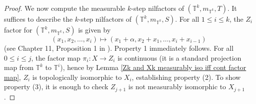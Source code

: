 \documentclass[12pt]{amsart}
\theoremstyle{definition}
\theoremstyle{plain}
\theoremstyle{definition}
\numberwithin{equation}{section}
\begin{document}
\begin{proof}
    



We now compute the measurable $k$-step nilfactors of $(\mathbb{T}^{k},m_{\mathbb{T}^{k}},T)$. It suffices to describe the $k$-step nilfactors of $(\mathbb{T}^{k},m_{\mathbb{T}^{k}},S)$.
For all $1\leq i \leq k$, the $Z_i$ factor for $(\mathbb{T}^{k},m_{\mathbb{T}^{k}},S)$ is given by $$(x_1,x_2,\dots,x_{i})\longmapsto (x_1+\alpha,x_2+x_1,\dots,x_{i}+x_{i-1})$$ (see Chapter 11, Proposition 1 in \cite{HK2}). Property 1 immediately follows. For all $0\leq i\leq j$, the factor map $\pi_{i}\colon X \rightarrow Z_{i}$ is continuous (it is a standard projection map from $\mathbb{T}^{k}$ to $\mathbb{T}^{i}$), hence by Lemma \ref{Zk and Xk measurably iso iff cont factor map}, $Z_i$ is topologically isomorphic to $X_i$, establishing property (2). To show property (3), it is enough to check $Z_{j+1}$ is not measurably isomorphic to $X_{j+1}$.


\end{proof}
\end{document}

